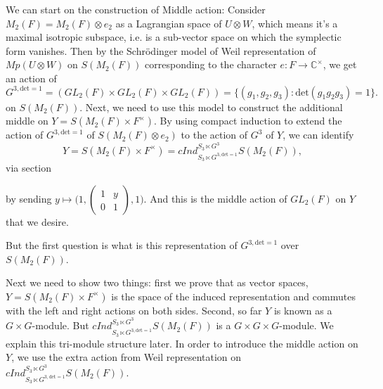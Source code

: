 \documentclass[12pt,a4paper,english]{article}
\theoremstyle{plain}
\theoremstyle{definition}
\begin{document}
We can start on the construction of Middle action:
Consider $M_{2}(F)=M_{2}(F)\otimes e_{2}$ as a Lagrangian space of $U\otimes W$, which means it's a maximal isotropic subspace, i.e. is a sub-vector space on which the symplectic form vanishes. Then by the Schr\"{o}dinger model of Weil representation of $Mp(U\otimes W)$ on $S(M_{2}(F))$ corresponding to the character $e: F\rightarrow \mathbb{C}^{\times}$, we get an action of 
\begin{equation*}
    G^{3,\text{det}=1}=(GL_{2}(F)\times GL_{2}(F)\times GL_{2}(F))=\{(g_{1}, g_{2}, g_{3}): \text{det}(g_{1} g_{2} g_{3})=1\}.
\end{equation*}
on $S(M_{2}(F))$.
Next, we need to use this model to construct the additional middle on $Y=S(M_{2}(F)\times F^{\times})$. By using compact induction to extend the action of $G^{3,\text{det}=1}$ of $S(M_{2}(F)\otimes e_{2})$ to the action of $G^{3}$ of $Y$, we can identify
\begin{equation*}
    Y=S(M_{2}(F)\times F^{\times})=cInd^{S_{3}\ltimes G^{3}}_{S_{3}\ltimes G^{3,\text{det}=1}}S(M_{2}(F)),
\end{equation*}
via section 
\begin{center}
\end{center}
by sending $y\mapsto \bigg(1,\begin{pmatrix}
1 &y\\
0&1
\end{pmatrix}, 1\bigg)$. 
And this is the middle action of $GL_{2}(F)$ on $Y$ that we desire. 

But the first question is what is this representation of $G^{3,\text{det}=1}$ over $S(M_{2}(F))$.


Next we need to show two things: first we prove that as vector spaces, $Y=S(M_{2}(F)\times F^{\times })$ is the space of the induced representation and commutes with the left and right actions on both sides. Second, so far $Y$ is known as a $G\times G$-module. But $cInd^{S_{3}\ltimes G^{3}}_{S_{3}\ltimes G^{3,\text{det}=1}}S(M_{2}(F))$ is a $G\times G\times G$-module. We explain  this tri-module structure later.   In order to introduce the middle action on $Y$, we use the extra action from Weil representation on $cInd^{S_{3}\ltimes G^{3}}_{S_{3}\ltimes G^{3,\text{det}=1}}S(M_{2}(F))$.
\end{document}
